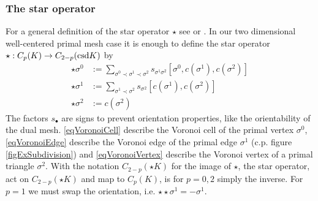     \subsubsection{The star operator}
      For a general definition of the star operator \( \star \) see \cite{hirani,desbrun} or \cite[Ch. 7]{siggraphKap7}.
      In our two dimensional well-centered primal mesh case it is enough to define the star operator 
      \( \star: C_{p}(K) \rightarrow C_{2-p}(\text{csd} K) \)
      by 
      \begin{align}
        \label{eqVoronoiCell}
       \star\sigma^{0} &:= \sum_{\sigma^{0} \prec \sigma^{1} \prec \sigma^{2}}
                                                   s_{\sigma^{1} \sigma^{2}} \left[ \sigma^{0}, c(\sigma^{1}), c(\sigma^{2}) \right] \\
       \label{eqVoronoiEdge}
       \star\sigma^{1} &:= \sum_{\sigma^{1} \prec \sigma^{2}}
                                                   s_{\sigma^{2}} \left[ c(\sigma^{1}), c(\sigma^{2}) \right] \\
       \label{eqVoronoiVertex}
       \star\sigma^{2} &:= c(\sigma^{2}) 
      \end{align}
      The factors \( s_{\bullet} \) are signs to prevent orientation properties, like the orientability of the dual mesh.
      \eqref{eqVoronoiCell} describe the Voronoi cell of the primal vertex \( \sigma^{0} \),
      \eqref{eqVoronoiEdge} describe the Voronoi edge of the primal edge \( \sigma^{1} \) (c.p. figure \ref{figExSubdivision})
      and \eqref{eqVoronoiVertex} describe the Voronoi vertex of a primal triangle \( \sigma^{2} \). 
      With the notation \(C_{2-p}( \star K)  \) for the image of \( \star \), 
      the star operator, act on \(C_{2-p}( \star K)  \) and map to \( C_{p}(K) \), is for \( p=0,2 \) simply the inverse.
      For \( p=1 \) we must swap the orientation, i.e. \( \star\star\sigma^{1}=-\sigma^{1} \).

